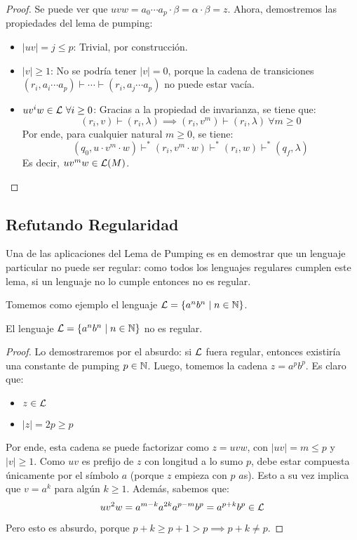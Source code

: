 \begin{proof}
    Se puede ver que $uvw = a_0 \cdots a_p \cdot \beta = \alpha \cdot \beta = z$. Ahora, demostremos las propiedades del lema de pumping:
    \begin{itemize}
        \item $|uv| = j \leq p$: Trivial, por construcción.
        \item $|v| \geq 1$: No se podría tener $|v| = 0$, porque la cadena de transiciones $(r_i, a_i \cdots a_p) \vdash \cdots \vdash (r_i, a_j \cdots a_p)$ no puede estar vacía.
        \item $u v^i w \in \mathcal{L} \ \forall i \geq 0$: Gracias a la propiedad de invarianza, se tiene que:
              $$
                  (r_i, v) \vdash (r_i, \lambda) \implies (r_i, v^m) \vdash (r_i, \lambda) \ \forall m \geq 0
              $$
              Por ende, para cualquier natural $m \geq 0$, se tiene:
              $$
                  (q_0, u \cdot v^m \cdot w) \vdash^* (r_i, v^m \cdot w) \vdash^* (r_i, w) \vdash^* (q_f, \lambda)
              $$
              Es decir, $u v^m w \in \mathcal{L}(M)$.
    \end{itemize}
\end{proof}

\subsection{Refutando Regularidad}

Una de las aplicaciones del Lema de Pumping es en demostrar que un lenguaje particular no puede ser regular: como todos los lenguajes regulares cumplen este lema, si un lenguaje no lo cumple entonces no es regular.

Tomemos como ejemplo el lenguaje $\mathcal{L} = \{a^n b^n \mid n \in \mathbb{N}\}$.

\begin{theorem*}
    El lenguaje $\mathcal{L} = \{a^n b^n \mid n \in \mathbb{N}\}$ no es regular.
\end{theorem*}
\begin{proof}
    Lo demostraremos por el absurdo: si $\mathcal{L}$ fuera regular, entonces existiría una constante de pumping $p \in \mathbb{N}$. Luego, tomemos la cadena $z = a^p b^p$. Es claro que:
    \begin{itemize}
        \item $z \in \mathcal{L}$
        \item $|z| = 2p \geq p$
    \end{itemize}

    Por ende, esta cadena se puede factorizar como $z = uvw$, con $|uv| = m \leq p$ y $|v| \geq 1$. Como $uv$ es prefijo de $z$ con longitud a lo sumo $p$, debe estar compuesta únicamente por el símbolo $a$ (porque $z$ empieza con $p$ $a$s). Esto a su vez implica que $v = a^k$ para algún $k \geq 1$. Además, sabemos que:
    $$uv^2w = a^{m-k}a^{2k}a^{p - m}b^p = a^{p + k}b^p \in \mathcal{L}$$

    Pero esto es absurdo, porque $p + k \geq p + 1 > p \implies p + k \neq p$.
\end{proof}
